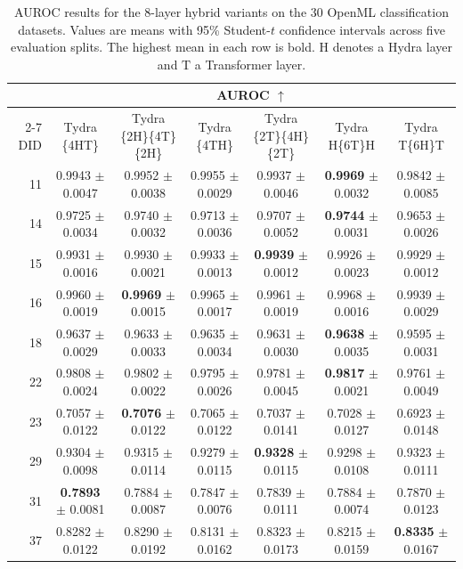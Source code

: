 \begin{table}[t]
\centering
\caption{AUROC results for the 8-layer hybrid variants on the 30 OpenML classification datasets. Values are means with 95\% Student-$t$ confidence intervals across five evaluation splits. The highest mean in each row is bold. $\mathrm{H}$ denotes a Hydra layer and $\mathrm{T}$ a Transformer layer.}
\label{tab:hybrid_variants_auc}
\setlength{\tabcolsep}{4pt}
\renewcommand{\arraystretch}{1.04}
\scriptsize
\begin{tabular*}{\textwidth}{@{\extracolsep{\fill}}rcccccc@{}}
\toprule
& \multicolumn{6}{c}{AUROC $\uparrow$} \\
\cmidrule(lr){2-7}
DID & Tydra \{4HT\} & Tydra \{2H\}\{4T\}\{2H\} & Tydra \{4TH\} & Tydra \{2T\}\{4H\}\{2T\} & Tydra H\{6T\}H & Tydra T\{6H\}T \\
\midrule
11 & 0.9943 $\pm$ 0.0047 & 0.9952 $\pm$ 0.0038 & 0.9955 $\pm$ 0.0029 & 0.9937 $\pm$ 0.0046 & \textbf{0.9969} $\pm$ 0.0032 & 0.9842 $\pm$ 0.0085 \\
14 & 0.9725 $\pm$ 0.0034 & 0.9740 $\pm$ 0.0032 & 0.9713 $\pm$ 0.0036 & 0.9707 $\pm$ 0.0052 & \textbf{0.9744} $\pm$ 0.0031 & 0.9653 $\pm$ 0.0026 \\
15 & 0.9931 $\pm$ 0.0016 & 0.9930 $\pm$ 0.0021 & 0.9933 $\pm$ 0.0013 & \textbf{0.9939} $\pm$ 0.0012 & 0.9926 $\pm$ 0.0023 & 0.9929 $\pm$ 0.0012 \\
16 & 0.9960 $\pm$ 0.0019 & \textbf{0.9969} $\pm$ 0.0015 & 0.9965 $\pm$ 0.0017 & 0.9961 $\pm$ 0.0019 & 0.9968 $\pm$ 0.0016 & 0.9939 $\pm$ 0.0029 \\
18 & 0.9637 $\pm$ 0.0029 & 0.9633 $\pm$ 0.0033 & 0.9635 $\pm$ 0.0034 & 0.9631 $\pm$ 0.0030 & \textbf{0.9638} $\pm$ 0.0035 & 0.9595 $\pm$ 0.0031 \\
22 & 0.9808 $\pm$ 0.0024 & 0.9802 $\pm$ 0.0022 & 0.9795 $\pm$ 0.0026 & 0.9781 $\pm$ 0.0045 & \textbf{0.9817} $\pm$ 0.0021 & 0.9761 $\pm$ 0.0049 \\
23 & 0.7057 $\pm$ 0.0122 & \textbf{0.7076} $\pm$ 0.0122 & 0.7065 $\pm$ 0.0122 & 0.7037 $\pm$ 0.0141 & 0.7028 $\pm$ 0.0127 & 0.6923 $\pm$ 0.0148 \\
29 & 0.9304 $\pm$ 0.0098 & 0.9315 $\pm$ 0.0114 & 0.9279 $\pm$ 0.0115 & \textbf{0.9328} $\pm$ 0.0115 & 0.9298 $\pm$ 0.0108 & 0.9323 $\pm$ 0.0111 \\
31 & \textbf{0.7893} $\pm$ 0.0081 & 0.7884 $\pm$ 0.0087 & 0.7847 $\pm$ 0.0076 & 0.7839 $\pm$ 0.0111 & 0.7884 $\pm$ 0.0074 & 0.7870 $\pm$ 0.0123 \\
37 & 0.8282 $\pm$ 0.0122 & 0.8290 $\pm$ 0.0192 & 0.8131 $\pm$ 0.0162 & 0.8323 $\pm$ 0.0173 & 0.8215 $\pm$ 0.0159 & \textbf{0.8335} $\pm$ 0.0167 \\

\end{tabular*}
\end{table}
